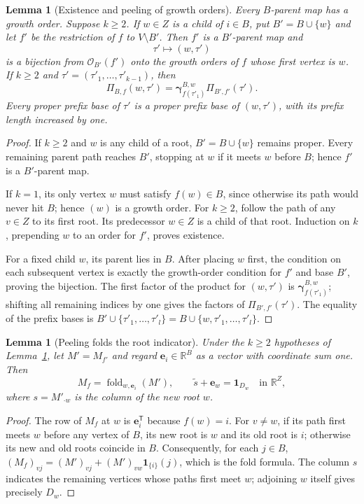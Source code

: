 \documentclass[11pt]{article}
\newtheorem{lemma}[definition]{Lemma}
\newcommand{\R}{\mathbb R}
\newcommand{\gam}{\boldsymbol\gamma}
\newcommand{\Ord}{\mathcal O}
\begin{document}
\begin{lemma}[Existence and peeling of growth orders]\label{lem:orders}
Every $B$-parent map has a growth order. Suppose $k\geq2$.
If $w\in Z$ is a child
of $i\in B$, put $B'=B\cup\{w\}$ and let $f'$ be the restriction of
$f$ to $V\setminus B'$. Then $f'$ is a $B'$-parent map and
\[
\tau'\longmapsto(w,\tau')
\]
is a bijection from $\Ord_{B'}(f')$ onto the growth orders of $f$
whose first vertex is $w$. If $k\geq2$ and
$\tau'=(\tau'_1,\ldots,\tau'_{k-1})$, then
\begin{equation}\label{eq:weight-peel}
\Pi_{B,f}(w,\tau')
=\gam^{B,w}_{f(\tau'_1)}\Pi_{B',f'}(\tau').
\end{equation}
Every proper prefix base of $\tau'$ is a proper prefix base of
$(w,\tau')$, with its prefix length increased by one.
\end{lemma}
\begin{proof}
If $k\geq2$ and $w$ is any child of a root, $B'=B\cup\{w\}$
remains proper. Every remaining parent path reaches $B'$, stopping
at $w$ if it meets $w$ before $B$; hence $f'$ is a
$B'$-parent map.

If $k=1$, its only vertex $w$ must satisfy $f(w)\in B$, since
otherwise its path would never hit $B$; hence $(w)$ is a growth
order. For $k\geq2$, follow the path of any $v\in Z$ to its first
root. Its predecessor $w\in Z$ is a child of that root.
Induction on $k$, prepending $w$ to an order for $f'$,
proves existence.

For a fixed child $w$, its parent lies in $B$. After placing $w$
first, the condition on each subsequent vertex is exactly the
growth-order condition for $f'$ and base $B'$, proving the bijection.
The first factor of the product for $(w,\tau')$ is
$\gam^{B,w}_{f(\tau'_1)}$; shifting all remaining indices by one
gives the factors of $\Pi_{B',f'}(\tau')$. The equality of the
prefix bases is
$B'\cup\{\tau'_1,\ldots,\tau'_l\}
=B\cup\{w,\tau'_1,\ldots,\tau'_l\}$.
\end{proof}

\begin{lemma}[Peeling folds the root indicator]\label{lem:forest-fold}
Under the $k\geq2$ hypotheses of Lemma~\ref{lem:orders},
let $M'=M_{f'}$ and regard
$\mathbf e_i\in\R^B$ as a vector with coordinate sum one. Then
\[
M_f=\operatorname{fold}_{w,\mathbf e_i}(M'),
\qquad
\widetilde s+\mathbf e_w=\mathbf1_{D_w}
\quad\text{in }\R^Z,
\]
where $s=M'_{\cdot w}$ is the column of the new root $w$.
\end{lemma}
\begin{proof}
The row of $M_f$ at $w$ is $\mathbf e_i^{\mathsf T}$ because
$f(w)=i$. For $v\neq w$, if its path first meets $w$ before any
vertex of $B$, its new root is $w$ and its old root is $i$;
otherwise its new and old roots coincide in $B$.
Consequently, for each $j\in B$,
$(M_f)_{vj}=(M')_{vj}+(M')_{vw}\mathbf1_{\{i\}}(j)$,
which is the fold formula. The column $s$ indicates the remaining
vertices whose paths first meet $w$; adjoining $w$ itself gives
precisely $D_w$.
\end{proof}
\end{document}
